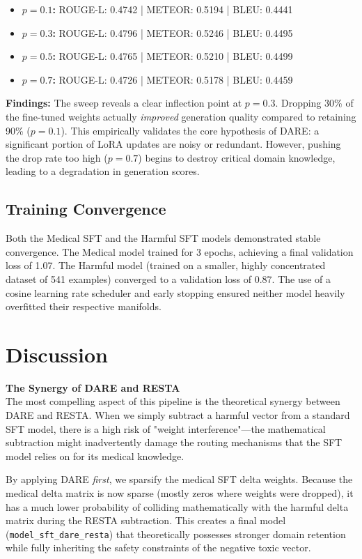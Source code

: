 \documentclass{article}
\begin{document}
\begin{itemize}
    \item \textbf{$p = 0.1$:} ROUGE-L: 0.4742 | METEOR: 0.5194 | BLEU: 0.4441
    \item \textbf{$p = 0.3$:} ROUGE-L: 0.4796 | METEOR: 0.5246 | BLEU: 0.4495
    \item \textbf{$p = 0.5$:} ROUGE-L: 0.4765 | METEOR: 0.5210 | BLEU: 0.4499
    \item \textbf{$p = 0.7$:} ROUGE-L: 0.4726 | METEOR: 0.5178 | BLEU: 0.4459
\end{itemize}

\textbf{Findings:} The sweep reveals a clear inflection point at $p = 0.3$. Dropping 30\% of the fine-tuned weights actually \textit{improved} generation quality compared to retaining 90\% ($p=0.1$). This empirically validates the core hypothesis of DARE: a significant portion of LoRA updates are noisy or redundant. However, pushing the drop rate too high ($p=0.7$) begins to destroy critical domain knowledge, leading to a degradation in generation scores. 

\subsection*{Training Convergence}
Both the Medical SFT and the Harmful SFT models demonstrated stable convergence. The Medical model trained for 3 epochs, achieving a final validation loss of 1.07. The Harmful model (trained on a smaller, highly concentrated dataset of 541 examples) converged to a validation loss of 0.87. The use of a cosine learning rate scheduler and early stopping ensured neither model heavily overfitted their respective manifolds.

\section*{Discussion}

\textbf{The Synergy of DARE and RESTA}\\
The most compelling aspect of this pipeline is the theoretical synergy between DARE and RESTA. 
When we simply subtract a harmful vector from a standard SFT model, there is a high risk of "weight interference"—the mathematical subtraction might inadvertently damage the routing mechanisms that the SFT model relies on for its medical knowledge. 

By applying DARE \textit{first}, we sparsify the medical SFT delta weights. Because the medical delta matrix is now sparse (mostly zeros where weights were dropped), it has a much lower probability of colliding mathematically with the harmful delta matrix during the RESTA subtraction. This creates a final model (\texttt{model\_sft\_dare\_resta}) that theoretically possesses stronger domain retention while fully inheriting the safety constraints of the negative toxic vector.
\end{document}
